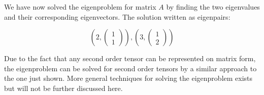 We have now solved the eigenproblem for matrix $A$ by finding the two
eigenvalues and their corresponding eigenvectors. The solution written as
eigenpairs:

\begin{equation}
(2, \begin{pmatrix} 1 \\ 1 \end{pmatrix} ),
( 3, \begin{pmatrix} 1 \\ 2 \end{pmatrix} )
\end{equation}

Due to the fact that any second order tensor can be represented on
matrix form, the eigenproblem can be solved for second order tensors
by a similar approach to the one just shown. More general techniques
for solving the eigenproblem exists but will not be further discussed
here. \\



